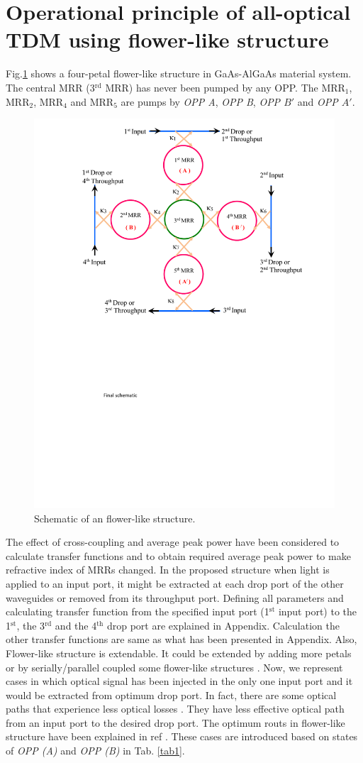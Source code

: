 \documentclass{osa-article}
\begin{document}
\section{ Operational principle of all-optical TDM using flower-like structure}
\label{} 
Fig.\ref{fig1_flower} shows a four-petal flower-like structure in GaAs-AlGaAs material system. The central MRR (3$^{\text{rd}}$ MRR) has never been pumped by any OPP. The MRR$_1$, MRR$_2$, MRR$_4$ and MRR$_5$ are pumps by \textit{OPP A}, \textit{OPP B}, \textit{OPP $B'$} and \textit{OPP $A'$}.
\begin{figure}[tb]
\centering
	\includegraphics[width=4 in]{figs/fig1_flower.pdf}
	\caption{Schematic of an flower-like structure.}
	\label{fig1_flower}
\end{figure}
 The effect of cross-coupling and average peak power have been considered to calculate transfer functions and to obtain required average peak power to make refractive index of MRRs changed. In the proposed structure when light is applied to an input port, it might be extracted at each drop port of the other waveguides or removed from its throughput port. Defining all parameters and calculating transfer function from the specified input port (1$^{\text{st}}$ input port) to the 1$^{\text{st}}$, the 3$^{\text{rd}}$ and the 4$^{\text{th}}$ drop port are explained in Appendix. Calculation the other transfer functions are same as what has been presented in Appendix. Also, Flower-like structure is extendable. It could be extended by adding more petals or by serially/parallel coupled some flower-like structures \cite{razaghi2016design}. Now, we represent cases in which optical signal has been injected in the only one input port and it would be extracted from optimum drop port. In fact, there are some optical paths that experience less optical losses \cite{razaghi2016design}. They have less effective optical path from an input port to the desired drop port. The optimum routs in flower-like structure have been explained in ref \cite{razaghi2016design}. These cases are introduced based on states of \textit{OPP (A)} and \textit{OPP (B)} in Tab. \ref{tab1}.
\end{document}
